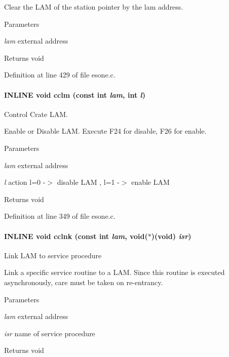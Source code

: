 Clear the LAM of the station pointer by the lam address.


\begin{DoxyParams}{Parameters}
\item[{\em lam}]external address \end{DoxyParams}
\begin{DoxyReturn}{Returns}
void 
\end{DoxyReturn}


Definition at line 429 of file esone.c.
\paragraph[{cclm}]{\setlength{\rightskip}{0pt plus 5cm}INLINE void cclm (const int {\em lam}, \/  int {\em l})}\hfill\label{esone_8c_a106dd0038ec7a124d344c3f2d2232a73}
Control Crate LAM.

Enable or Disable LAM. Execute F24 for disable, F26 for enable.


\begin{DoxyParams}{Parameters}
\item[{\em lam}]external address \item[{\em l}]action l=0 -\/$>$ disable LAM , l=1 -\/$>$ enable LAM \end{DoxyParams}
\begin{DoxyReturn}{Returns}
void 
\end{DoxyReturn}


Definition at line 349 of file esone.c.
\paragraph[{cclnk}]{\setlength{\rightskip}{0pt plus 5cm}INLINE void cclnk (const int {\em lam}, \/  void($\ast$)(void) {\em isr})}\hfill\label{esone_8c_a783e6a7777ca52b89826301edfe79c6d}
Link LAM to service procedure

Link a specific service routine to a LAM. Since this routine is executed asynchronously, care must be taken on re-\/entrancy.


\begin{DoxyParams}{Parameters}
\item[{\em lam}]external address \item[{\em isr}]name of service procedure \end{DoxyParams}
\begin{DoxyReturn}{Returns}
void 
\end{DoxyReturn}


